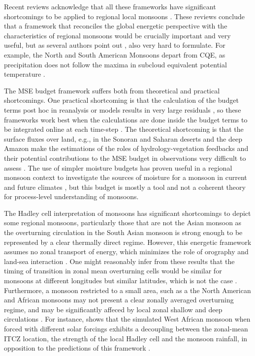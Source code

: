 Recent reviews acknowledge that all these frameworks have significant shortcomings to be applied to regional local monsoons \citep{biasutti2018global,hill2019,geen2020}. These reviews conclude that a framework that reconciles the global energetic perspective with the characteristics of regional monsoons would be crucially important and very useful, but as several authors point out \citep[e.g.][]{biasutti2018global,hill2019}, also very hard to formulate. For example, the North and South American Monsoons depart from CQE, as precipitation does not follow the maxima in subcloud equivalent potential temperature \citep{nie2010observational,geen2020}. 

 The MSE budget framework suffers both from theoretical and practical shortcomings. One practical shortcoming is that the calculation of the budget terms post hoc in reanalysis or models results in very large residuals \citep{hill2019}, so these frameworks work best when the calculations are done inside the budget terms to be integrated online at each time-step \citep[e.g.][]{ma2019}.
The theoretical shortcoming is that the surface fluxes over land, e.g., in the Sonoran and Saharan deserts and the deep Amazon make the estimations of the roles of hydrology-vegetation feedbacks and their potential contributions to the MSE budget in observations very difficult to assess \citep{boos2016,pascale2019}. The use of simpler moisture budgets has proven useful in a regional monsoon context to investigate the sources of moisture for a monsoon in current  \citep{ordonez2019,martinez2019} and future climates \citep{smyth2020}, but this budget is mostly a tool and not a coherent theory for process-level understanding of monsoons.

 
The Hadley cell interpretation of monsoons has significant shortcomings to depict some regional monsoons, particularly those that are not the Asian monsoon as the overturning circulation in the South Asian monsoon is strong enough to be represented by a clear thermally direct regime.
However, this energetic framework assumes no zonal transport of energy, which minimizes the role of orography and land-sea interaction \citep{biasutti2018global}.
One might reasonably infer from these results that the timing of transition in zonal mean overturning cells would be similar for monsoons at different longitudes but similar latitudes, which is not the case \citep{wang2017}.
Furthermore, a monsoon restricted to a small area, such as a the North American and African monsoons may not present a clear zonally averaged overturning regime, and may be significantly affeced by local zonal shallow and deep circulations \citep{zhai2015regime}. For instance, \cite{smyth2018simulated} shows that the simulated West African monsoon when forced with different solar forcings exhibits a decoupling between the zonal-mean ITCZ location, the strength of the local Hadley cell and the monsoon rainfall, in opposition to the predictions of this framework \citep{bordoni2008monsoons}.


